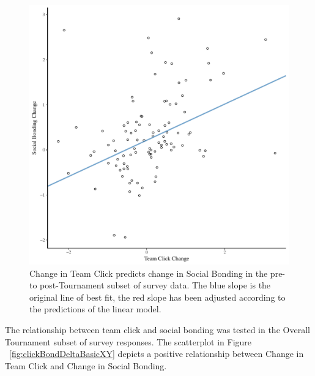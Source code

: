\begin{CJK}{UTF8}{gbsn}
  \begin{figure}[htbp]
    \centering
  \includegraphics[scale=.5]{images/clickBondDeltaModelSlope.pdf}
    \caption{Change in Team Click predicts change in Social Bonding in the pre- to post-Tournament subset of survey data. The blue slope is the original line of best fit, the red slope has been adjusted according to the predictions of the linear model.}
    \label{fig:clickBondDeltaModelSlope}
  \end{figure}


   The relationship between team click and social bonding was tested in the Overall Tournament subset of survey responses. The scatterplot in Figure ~\ref{fig:clickBondDeltaBasicXY} depicts a positive relationship between Change in Team Click and Change in Social Bonding.


\end{CJK}
